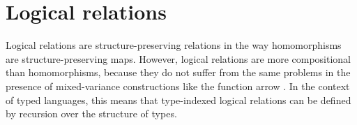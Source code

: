 \documentclass[draft,11pt]{report}
\begin{document}

%
%
%
%
%


\section{Logical relations} %

Logical relations are structure-preserving relations
in the way homomorphisms are structure-preserving maps.
However,
logical relations are more compositional than homomorphisms,
because they do not suffer from the same problems
in the presence of mixed-variance constructions
like the function arrow %
\citep{lrp}.
In the context of typed languages,
this means that type-indexed logical relations
can be defined by recursion over the structure of types.
\end{document}
